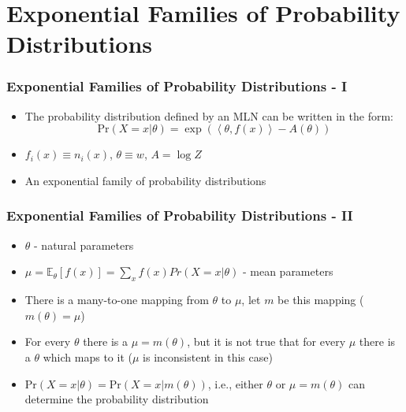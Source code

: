 \documentclass{beamer}
\newcommand{\Prob}{\mbox{Pr}}
\begin{document}
\section{Exponential Families of Probability Distributions}
\frame
{
  \frametitle{Exponential Families of Probability Distributions - I}

  \begin{itemize}
    \item The probability distribution defined by an MLN can be written in
          the form:
        \begin{equation*}
            \Prob(X=x|\theta)=\exp
                   \left(\left<\theta,f(x)\right>-A(\theta)\right) 
         \end{equation*}
    \item $f_{i}(x) \equiv n_i(x)$, $\theta \equiv w$, $A=\log Z$  
    \item An exponential family of probability distributions
  \end{itemize}
}

\frame
{
  \frametitle{Exponential Families of Probability Distributions - II}

  \begin{itemize}
    \item $\theta$ - natural parameters
    \item $\mu=\mathbb{E}_{\theta}[f(x)]=\sum_{x} f(x) Pr(X=x|\theta)$ - mean parameters
    \item There is a many-to-one mapping from $\theta$ to $\mu$, let $m$ be this mapping ($m(\theta)=\mu$)
    \item For every $\theta$ there is a $\mu=m(\theta)$, but it is not true that for every $\mu$ there is a $\theta$ 
			which maps to it ($\mu$ is inconsistent in this case)
    \item $\Prob(X=x|\theta)=\Prob(X=x|m(\theta))$, i.e., either $\theta$ or $\mu=m(\theta)$ can determine
          the probability distribution
  \end{itemize}
}
\end{document}
